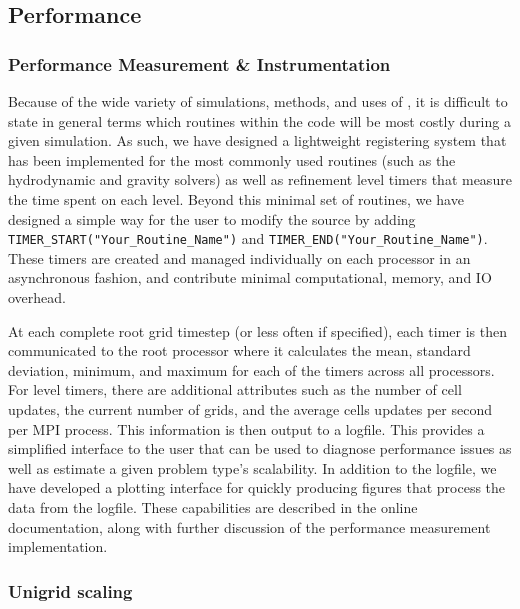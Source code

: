 
\subsection{Performance}
\label{sec.performance}

\subsubsection{Performance Measurement \& Instrumentation}

Because of the wide variety of simulations, methods, and uses of \enzo,
it is difficult to state in general terms which routines within the
code will be most costly during a given simulation.  As such, we have
designed a lightweight registering system that has been implemented
for the most commonly used routines (such as the hydrodynamic and
gravity solvers) as well as refinement level timers that measure the
time spent on each level.  Beyond this minimal set of routines, we
have designed a simple way for the user to modify the source by adding
\texttt{TIMER\_START("Your\_Routine\_Name")} and
\texttt{TIMER\_END("Your\_Routine\_Name")}.  These timers are created
and managed individually on each processor in an asynchronous fashion,
and contribute minimal computational, memory, and IO overhead.

At each complete root grid timestep (or less often if specified),
each timer is then communicated to the root processor where it
calculates the mean, standard deviation, minimum, and maximum for each
of the timers across all processors.  For level timers, there are additional
attributes such as the number of cell updates, the current number of
grids, and the average cells updates per second per MPI process.  This
information is then 
output to a logfile.  This provides a simplified interface to the user
that can be used to diagnose performance issues as well as estimate a
given problem type's scalability.  In addition to the logfile, we have
developed a plotting interface for quickly producing figures that
process the data from the logfile.  These capabilities are described
in the online documentation, along with further discussion of the
performance measurement implementation.

\subsubsection{Unigrid scaling}
\label{sec:weak_scaling}

